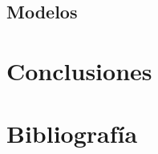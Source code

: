 \documentclass[12pt,twoside]{templates/facsothesis}
\begin{document}
\hypertarget{modelos}{%
\section{Modelos}\label{modelos}}

\hypertarget{conclusiones}{%
\chapter{Conclusiones}\label{conclusiones}}

\hypertarget{bibliografuxeda}{%
\chapter*{Bibliografía}\label{bibliografuxeda}}



\end{document}
